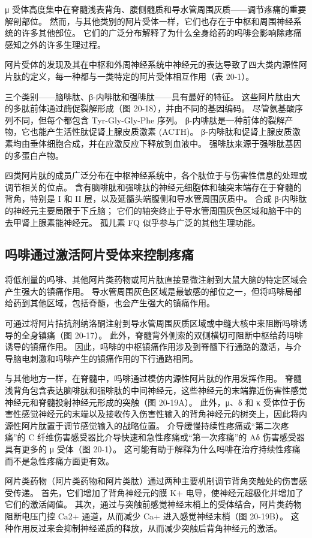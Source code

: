 μ 受体高度集中在脊髓浅表背角、腹侧髓质和导水管周围灰质——调节疼痛的重要解剖部位。 然而，与其他类别的阿片受体一样，它们也存在于中枢和周围神经系统的许多其他部位。 它们的广泛分布解释了为什么全身给药的吗啡会影响除疼痛感知之外的许多生理过程。

阿片受体的发现及其在中枢和外周神经系统中神经元的表达导致了四大类内源性阿片肽的定义，每一种都与一类特定的阿片受体相互作用（表 20-1）。

三个类别——脑啡肽、β-内啡肽和强啡肽——具有最好的特征。 这些阿片肽由大的多肽前体通过酶促裂解形成（图 20-18），并由不同的基因编码。 尽管氨基酸序列不同，但每个都包含 Tyr-Gly-Gly-Phe 序列。 β-内啡肽是一种前体的裂解产物，它也能产生活性肽促肾上腺皮质激素 (ACTH)。 β-内啡肽和促肾上腺皮质激素均由垂体细胞合成，并在应激反应下释放到血液中。 强啡肽来源于强啡肽基因的多蛋白产物。

四类阿片肽的成员广泛分布在中枢神经系统中，各个肽位于与伤害性信息的处理或调节相关的位点。 含有脑啡肽和强啡肽的神经元细胞体和轴突末端存在于脊髓的背角，特别是 I 和 II 层，以及延髓头端腹侧和导水管周围灰质中。 合成 β-内啡肽的神经元主要局限于下丘脑； 它们的轴突终止于导水管周围灰色区域和脑干中的去甲肾上腺素能神经元。 孤儿素 FQ 似乎参与广泛的其他生理功能。

\subsection{吗啡通过激活阿片受体来控制疼痛}
将低剂量的吗啡、其他阿片类药物或阿片肽直接显微注射到大鼠大脑的特定区域会产生强大的镇痛作用。 导水管周围灰色区域是最敏感的部位之一，但将吗啡局部给药到其他区域，包括脊髓，也会产生强大的镇痛作用。

可通过将阿片拮抗剂纳洛酮注射到导水管周围灰质区域或中缝大核中来阻断吗啡诱导的全身镇痛（图 20-17）。 此外，脊髓背外侧索的双侧横切可阻断中枢给药吗啡诱导的镇痛作用。 因此，吗啡的中枢镇痛作用涉及到脊髓下行通路的激活，与介导脑电刺激和吗啡产生的镇痛作用的下行通路相同。

与其他地方一样，在脊髓中，吗啡通过模仿内源性阿片肽的作用发挥作用。 脊髓浅背角包含表达脑啡肽和强啡肽的中间神经元，这些神经元的末端靠近伤害性感觉神经元和脊髓投射神经元形成的突触（图 20-19A）。 此外，μ、δ 和 κ 受体位于伤害性感觉神经元的末端以及接收传入伤害性输入的背角神经元的树突上，因此将内源性阿片肽置于调节感觉输入的战略位置。 介导缓慢持续性疼痛或“第二次疼痛”的 C 纤维伤害感受器比介导快速和急性疼痛或“第一次疼痛”的 Aδ 伤害感受器具有更多的 μ 受体（图 20-1）。 这可能有助于解释为什么吗啡在治疗持续性疼痛而不是急性疼痛方面更有效。

阿片类药物（阿片类药物和阿片类肽）通过两种主要机制调节背角突触处的伤害感受传递。 首先，它们增加了背角神经元的膜 K+ 电导，使神经元超极化并增加了它们的激活阈值。 其次，通过与突触前感觉神经末梢上的受体结合，阿片类药物阻断电压门控 Ca2+ 通道，从而减少 Ca+ 进入感觉神经末梢（图 20-19B）。 这种作用反过来会抑制神经递质的释放，从而减少突触后背角神经元的激活。

